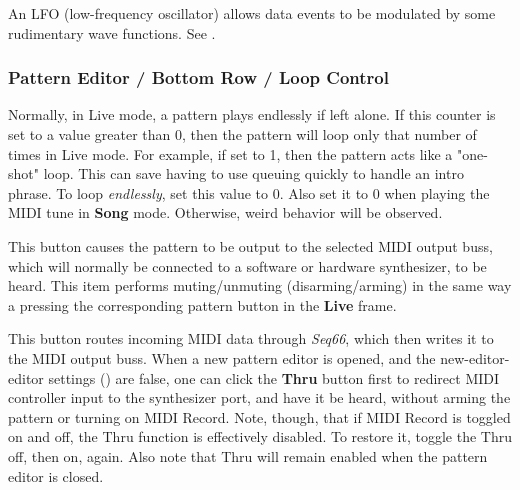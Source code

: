    \setcounter{ItemCounter}{0}      %

   An LFO (low-frequency oscillator) allows data events
   to be modulated by some rudimentary wave functions.
   See .

\subsubsection{Pattern Editor / Bottom Row / Loop Control}
\label{subsubsec:pattern_editor_bottom_loop_control}

   \setcounter{ItemCounter}{0}      %

   Normally, in Live mode, a pattern plays endlessly if left alone.
   If this counter is set to a value greater than 0, then the pattern will loop
   only that number of times in Live mode.  For example, if set to 1, then the
   pattern acts like a "one-shot" loop.  This can save having to use
   queuing quickly to handle an intro phrase.
   To loop \textsl{endlessly}, set this value to 0.
   Also set it to 0 when playing the MIDI tune in \textbf{Song} mode.
   Otherwise, weird behavior will be observed.

   This button causes the pattern to be output to the
   selected MIDI output buss,
   which will normally be connected to a software or hardware
   synthesizer, to be heard.
   This item performs muting/unmuting (disarming/arming) in the same way a
   pressing the corresponding pattern button in the \textbf{Live} frame.

   This button routes incoming MIDI data through
   \textsl{Seq66}, which then writes it to the MIDI output buss.
   When a new pattern editor is opened,
   and the new-editor-editor settings
   ()
   are false, one can click the
   \textbf{Thru} button first to redirect MIDI controller input
   to the synthesizer port, and have it be heard, without
   arming the pattern or turning on MIDI Record.
   Note, though, that if MIDI Record is toggled on and off, the
   Thru function is effectively disabled.  To restore it,
   toggle the Thru off, then on, again.
   Also note that Thru will remain enabled when the pattern editor is closed.

